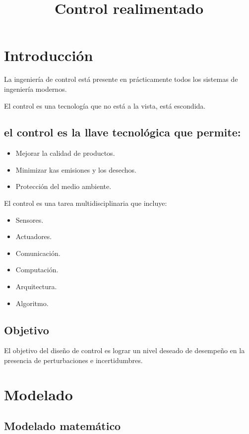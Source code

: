 \documentclass[a4paper]{article}
\begin{document}
\title{Control realimentado}
\date{}
\maketitle
\section{Introducción}\label{sec:intro}

La ingeniería de control está presente en prácticamente todos los sistemas de ingeniería modernos.

El control es una tecnología que no está a la vista, está escondida.

\subsection{el control es la llave tecnológica que permite:}
\begin{itemize}
\item Mejorar la calidad de productos.
\item Minimizar kas emisiones y los desechos.
\item Protección del medio ambiente.
\end{itemize}

El control es una tarea multidisciplinaria que incluye:
\begin{itemize}
\item Sensores.
\item Actuadores.
\item Comunicación.
\item Computación.
\item Arquitectura.
\item Algoritmo.
\end{itemize}

\subsection{Objetivo}

El objetivo del diseño de control es lograr un nivel deseado de desempeño en la presencia de perturbaciones e incertidumbres.

\section{Modelado}\label{sec:modelado}
\subsection{Modelado matemático}
\end{document}
